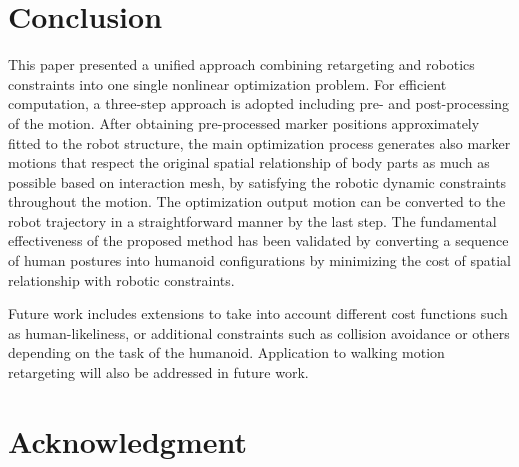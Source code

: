 \documentclass[letterpaper, 10 pt, conference]{ieeeconf}  %
\begin{document}
\addtolength{\textheight}{-6cm}

\section{Conclusion}
\label{sec:conclusion}

This paper presented a unified approach combining retargeting and
robotics constraints into one single nonlinear optimization
problem.
For efficient computation, a three-step approach is adopted including
pre- and post-processing of the motion.
After obtaining pre-processed marker positions approximately fitted to
the robot structure, the main optimization process generates 
also marker motions that respect the original spatial relationship of body
parts as much as possible based on interaction mesh, by satisfying the
robotic dynamic constraints throughout the motion.
The optimization output motion can be converted to the robot trajectory
in a straightforward manner by the last step.
The fundamental effectiveness of the proposed method has been validated
by converting a sequence of human postures into humanoid
configurations by minimizing the cost of spatial relationship with
robotic constraints.

Future work includes extensions to take into account different cost
functions such as human-likeliness, or additional constraints such
as collision avoidance or others depending on the task of the humanoid.
Application to walking motion retargeting will also be addressed in
future work.








%
%
\section*{Acknowledgment}
\end{document}
